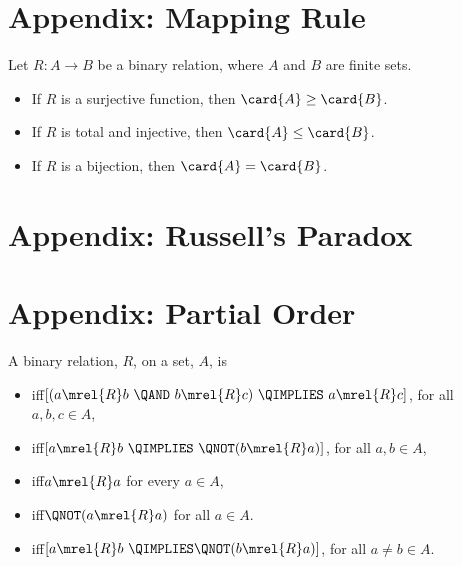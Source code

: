 \documentclass[handout]{mcs}
\begin{document}

\section*{Appendix: Mapping Rule}

Let $R: A \to B$ be a binary relation, where $A$ and $B$ are finite sets.

\begin{itemize}

\item\label{mapping-sur} If $R$ is a surjective function, then $\card{A} \geq \card{B}$.

\item\label{mapping-inj} If $R$ is total and injective, then $\card{A} \leq \card{B}$.

\item\label{mapping-bij} If $R$ is a bijection, then $\card{A} = \card{B}$.

\end{itemize}

\section*{Appendix: Russell's Paradox}


\section*{Appendix: Partial Order}

A binary relation, $R$, on a set, $A$, is
\begin{itemize}

\item {} iff\quad $[(a\mrel{R}b\ \QAND\ b\mrel{R}c)\ \QIMPLIES\
  a\mrel{R} c]$, for all $a,b,c\in A$,

\item {} iff\quad $[a\mrel{R}b\ \QIMPLIES \ \QNOT(b\mrel{R}a)]$,
  for all $a,b\in A$,

\item {} iff\quad $a \mrel{R} a$ for every $a \in A$,

\item {} iff\quad $\QNOT(a \mrel{R} a)$ for all $a \in A$.

\item {} iff\quad $[a\mrel{R}b\ \QIMPLIES \QNOT(b\mrel{R}a)]$,
  for all $a \neq b\in A$.

\end{itemize}
\end{document}
